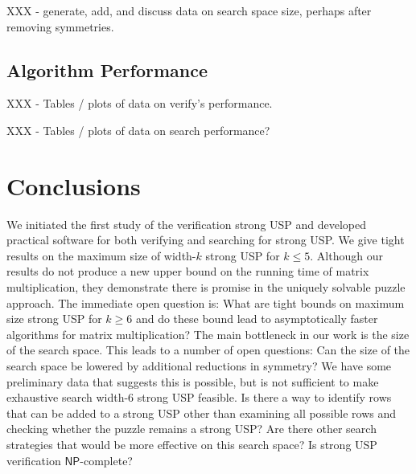 \documentclass[11pt]{article}
\renewcommand\NP{\ensuremath{\mathsf{NP}}}
\begin{document}
XXX - generate, add, and discuss data on search space size, perhaps
after removing symmetries.


\subsection{Algorithm Performance}
\label{subsec:performance}

XXX - Tables / plots of data on verify's performance.

XXX - Tables / plots of data on search performance?

\section{Conclusions}
\label{sec:conclusion}

We initiated the first study of the verification strong USP and
developed practical software for both verifying and searching for strong
USP.  We give tight results on the maximum size of width-$k$ strong
USP for $k \le 5$.  Although our results do not produce a new upper
bound on the running time of matrix multiplication, they demonstrate
there is promise in the uniquely solvable puzzle approach.  The
immediate open question is: What are tight bounds on maximum size
strong USP for $k \ge 6$ and do these bound lead to asymptotically
faster algorithms for matrix multiplication?  The main bottleneck in
our work is the size of the search space.  This leads to a number of
open questions: Can the size of the search space be lowered by
additional reductions in symmetry?  We have some preliminary data that
suggests this is possible, but is not sufficient to make exhaustive
search width-6 strong USP feasible.  Is there a way to identify rows
that can be added to a strong USP other than examining all possible
rows and checking whether the puzzle remains a strong USP?  Are there
other search strategies that would be more effective on this search
space?  Is strong USP verification \NP-complete?

 

\appendix
\end{document}
